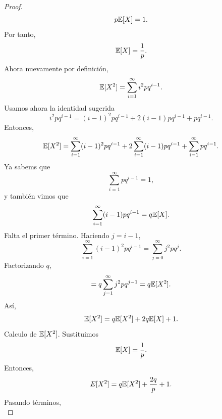 \documentclass[12pt,a4paper]{article}
\begin{document}
\begin{proof}
        \begin{equation*}
            p\mathbb{E}[X]=1.
        \end{equation*}
        Por tanto,
        \begin{equation*}
            \mathbb{E}[X]=\frac{1}{p}.
        \end{equation*}
        Ahora nuevamente por definición,
        \begin{equation*}
            \mathbb{E}[X^{2}]=\sum_{i=1}^{\infty}i^{2}pq^{i-1}.
        \end{equation*}
        Usamos ahora la identidad sugerida
        \begin{equation*}
            i^{2}pq^{i-1}=(i-1)^{2}pq^{i-1}+2(i-1)pq^{i-1}+pq^{i-1}.
        \end{equation*}
        Entonces,
        \begin{equation*}
            \mathbb{E}[X^{2}]=\sum_{i=1}^{\infty}(i-1)^{2}pq^{i-1}+2\sum_{i=1}^{\infty}(i-1)pq^{i-1}+\sum_{i=1}^{\infty}pq^{i-1}.
        \end{equation*}
        Ya sabems que
        \begin{equation*}
            \sum_{i=1}^{\infty}pq^{i-1}=1,
        \end{equation*}
        y también vimos que
        \begin{equation*}
            \sum_{i=1}^{\infty}(i-1)pq^{i-1}=q\mathbb{E}[X].
        \end{equation*}
        Falta el primer término. Haciendo $j=i-1$,
        \begin{equation*}
            \sum_{i=1}^{\infty}(i-1)^{2}pq^{i-1}=\sum_{j=0}^{\infty}j^{2}pq^{j}.
        \end{equation*}
        Factorizando $q$,
        \begin{equation*}
            =q\sum_{j=1}^{\infty}j^{2}pq^{j-1}=q\mathbb{E}[X^{2}].
        \end{equation*}
        Así,
        \begin{equation*}
            \mathbb{E}[X^{2}]=q\mathbb{E}[X^{2}]+2q\mathbb{E}[X]+1.
        \end{equation*}
        Calculo de $\mathbb{E}[X^{2}]$. Sustituimos
        \begin{equation*}
            \mathbb{E}[X]=\frac{1}{p}.
        \end{equation*}
        Entonces,
        \begin{equation*}
            E[X^{2}]=q\mathbb{E}[X^{2}]+\frac{2q}{p}+1.
        \end{equation*}
        Pasando términos,
        \begin{equation*}

\end{equation*}
\end{proof}
\end{document}
